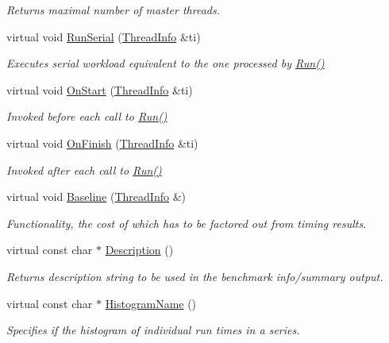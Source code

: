 \begin{DoxyCompactItemize}
\begin{DoxyCompactList}\small\item\em Returns maximal number of master threads. \end{DoxyCompactList}\item 
virtual void \hyperlink{classPerf_1_1Test_aa36442055c9cd1267cbdf8a0bf431239}{Run\+Serial} (\hyperlink{structPerf_1_1Test_1_1ThreadInfo}{Thread\+Info} \&ti)
\begin{DoxyCompactList}\small\item\em Executes serial workload equivalent to the one processed by \hyperlink{classPerf_1_1Test_a64ad02d5651eb526f14e8d17df229cfb}{Run()} \end{DoxyCompactList}\item 
virtual void \hyperlink{classPerf_1_1Test_a87a68df5a69fe0805fc858ea9756d42d}{On\+Start} (\hyperlink{structPerf_1_1Test_1_1ThreadInfo}{Thread\+Info} \&ti)
\begin{DoxyCompactList}\small\item\em Invoked before each call to \hyperlink{classPerf_1_1Test_a64ad02d5651eb526f14e8d17df229cfb}{Run()} \end{DoxyCompactList}\item 
virtual void \hyperlink{classPerf_1_1Test_a496b4663baca967436dad05299deed2b}{On\+Finish} (\hyperlink{structPerf_1_1Test_1_1ThreadInfo}{Thread\+Info} \&ti)
\begin{DoxyCompactList}\small\item\em Invoked after each call to \hyperlink{classPerf_1_1Test_a64ad02d5651eb526f14e8d17df229cfb}{Run()} \end{DoxyCompactList}\item 
virtual void \hyperlink{classPerf_1_1Test_ac3d76a83270f92de9e7e0349d6765f51}{Baseline} (\hyperlink{structPerf_1_1Test_1_1ThreadInfo}{Thread\+Info} \&)
\begin{DoxyCompactList}\small\item\em Functionality, the cost of which has to be factored out from timing results. \end{DoxyCompactList}\item 
\hypertarget{classPerf_1_1Test_a1e4dfdeff61c870a24e00bdf23a4df79}{}virtual const char $\ast$ \hyperlink{classPerf_1_1Test_a1e4dfdeff61c870a24e00bdf23a4df79}{Description} ()\label{classPerf_1_1Test_a1e4dfdeff61c870a24e00bdf23a4df79}

\begin{DoxyCompactList}\small\item\em Returns description string to be used in the benchmark info/summary output. \end{DoxyCompactList}\item 
virtual const char $\ast$ \hyperlink{classPerf_1_1Test_a10d8919439d2f0bc37aafbb447a2c493}{Histogram\+Name} ()
\begin{DoxyCompactList}\small\item\em Specifies if the histogram of individual run times in a series. \end{DoxyCompactList}\end{DoxyCompactItemize}


